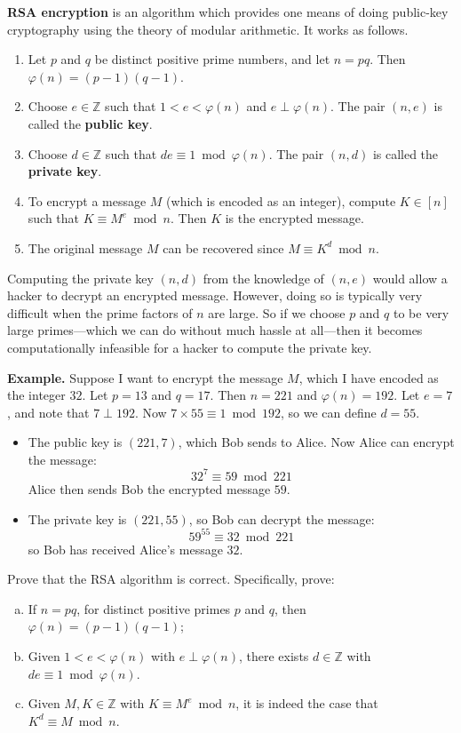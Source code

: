 \textbf{RSA encryption} is an algorithm which provides one means of doing public-key cryptography using the theory of modular arithmetic. It works as follows.
\begin{enumerate}[leftmargin={37.5pt}, label={\textbf{Step \arabic*.}}]
\item Let $p$ and $q$ be distinct positive prime numbers, and let $n = pq$. Then $\varphi(n) = (p-1)(q-1)$.
\item Choose $e \in \mathbb{Z}$ such that $1 < e < \varphi(n)$ and $e \perp \varphi(n)$. The pair $(n,e)$ is called the \textbf{public key}.
\item Choose $d \in \mathbb{Z}$ such that $de \equiv 1 \bmod \varphi(n)$. The pair $(n,d)$ is called the \textbf{private key}.
\item To encrypt a message $M$ (which is encoded as an integer), compute $K \in [n]$ such that $K \equiv M^e \bmod n$. Then $K$ is the encrypted message.
\item The original message $M$ can be recovered since $M \equiv K^d \bmod n$.
\end{enumerate}
Computing the private key $(n,d)$ from the knowledge of $(n,e)$ would allow a hacker to decrypt an encrypted message. However, doing so is typically very difficult when the prime factors of $n$ are large. So if we choose $p$ and $q$ to be very large primes---which we can do without much hassle at all---then it becomes computationally infeasible for a hacker to compute the private key.

\textbf{Example.} Suppose I want to encrypt the message $M$, which I have encoded as the integer $32$. Let $p=13$ and $q=17$. Then $n=221$ and $\varphi(n)=192$. Let $e = 7$, and note that $7 \perp 192$. Now $7 \times 55 \equiv 1 \bmod{192}$, so we can define $d=55$.
\begin{itemize}
\item The public key is $(221,7)$, which Bob sends to Alice. Now Alice can encrypt the message:
\[ 32^7 \equiv 59 \bmod 221 \]
Alice then sends Bob the encrypted message $59$.
\item The private key is $(221, 55)$, so Bob can decrypt the message:
\[ 59^{55} \equiv 32 \bmod 221 \]
so Bob has received Alice's message $32$.
\end{itemize}

\begin{exercise}
Prove that the RSA algorithm is correct. Specifically, prove:
\begin{enumerate}[(a)]
\item If $n=pq$, for distinct positive primes $p$ and $q$, then $\varphi(n) = (p-1)(q-1)$;
\item Given $1<e<\varphi(n)$ with $e \perp \varphi(n)$, there exists $d \in \mathbb{Z}$ with $de \equiv 1 \bmod \varphi(n)$.
\item Given $M,K \in \mathbb{Z}$ with $K \equiv M^e \bmod n$, it is indeed the case that $K^d \equiv M \bmod n$.
\end{enumerate}
\end{exercise}

